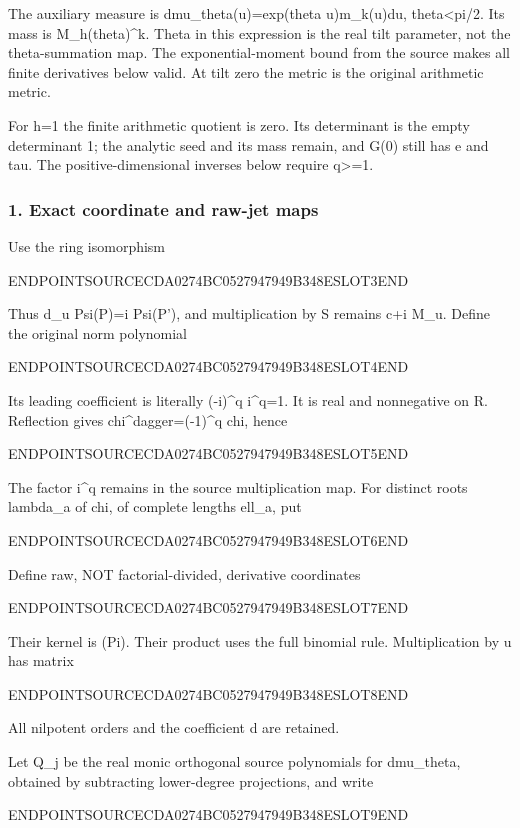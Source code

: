 The auxiliary measure is dmu\_theta(u)=exp(theta u)m\_k(u)du, \textbar theta\textbar\textless pi/2. Its mass is M\_h(theta)\^{}k. Theta in this expression is the real tilt parameter, not the theta-summation map. The exponential-moment bound from the source makes all finite derivatives below valid. At tilt zero the metric is the original arithmetic metric.

For h=1 the finite arithmetic quotient is zero. Its determinant is the empty determinant 1; the analytic seed and its mass remain, and G(0) still has e and tau. The positive-dimensional inverses below require q\textgreater=1.

\subsubsection{1. Exact coordinate and raw-jet maps}\label{endpoint-pr24_original--exact-coordinate-and-raw-jet-maps}

Use the ring isomorphism

ENDPOINTSOURCECDA0274BC0527947949B348ESLOT3END

Thus d\_u Psi(P)=i Psi(P'), and multiplication by S remains c+i M\_u. Define the original norm polynomial

ENDPOINTSOURCECDA0274BC0527947949B348ESLOT4END

Its leading coefficient is literally (-i)\^{}q i\^{}q=1. It is real and nonnegative on R. Reflection gives chi\^{}dagger=(-1)\^{}q chi, hence

ENDPOINTSOURCECDA0274BC0527947949B348ESLOT5END

The factor i\^{}q remains in the source multiplication map. For distinct roots lambda\_a of chi, of complete lengths ell\_a, put

ENDPOINTSOURCECDA0274BC0527947949B348ESLOT6END

Define raw, NOT factorial-divided, derivative coordinates

ENDPOINTSOURCECDA0274BC0527947949B348ESLOT7END

Their kernel is (Pi). Their product uses the full binomial rule. Multiplication by u has matrix

ENDPOINTSOURCECDA0274BC0527947949B348ESLOT8END

All nilpotent orders and the coefficient d are retained.

Let Q\_j be the real monic orthogonal source polynomials for dmu\_theta, obtained by subtracting lower-degree projections, and write

ENDPOINTSOURCECDA0274BC0527947949B348ESLOT9END

